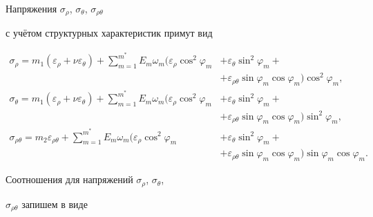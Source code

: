 Напряжения $\sigma_{\rho}$, $\sigma_\theta$, $\sigma_{\rho\theta}$

с учётом структурных характеристик примут вид

\begin{equation}

\label{eq:nemfed:pol4}

\begin{aligned}

\sigma_\rho =m_1(\varepsilon_\rho+\nu\varepsilon_\theta

)+\sum_{m=1}^{m^*}E_m\omega_m(\varepsilon_\rho\cos^2\varphi_m

&+\varepsilon_\theta\sin^2\varphi_m+

\\

&+\varepsilon_{\rho\theta}\sin\varphi_m\cos\varphi_m)\cos^2\varphi_m,\\

\sigma_\theta =m_1(\varepsilon_\rho+\nu\varepsilon_\theta

)+\sum_{m=1}^{m^*}E_m\omega_m(\varepsilon_\rho\cos^2\varphi_m&+\varepsilon_\theta\sin^2\varphi_m+\\

&+\varepsilon_{\rho\theta}\sin\varphi_m\cos\varphi_m)\sin^2\varphi_m,\\

\sigma_{\rho\theta}

=m_2\varepsilon_{\rho\theta}+\sum_{m=1}^{m^*}E_m\omega_m(\varepsilon_\rho\cos^2\varphi_m&+

\varepsilon_\theta\sin^2\varphi_m+\\

&+\varepsilon_{\rho\theta}\sin\varphi_m\cos\varphi_m)\sin\varphi_m\cos\varphi_m.

\end{aligned}

\end{equation}



Соотношения для  напряжений $\sigma_{\rho}$, $\sigma_\theta$,

$\sigma_{\rho\theta}$  запишем в виде

